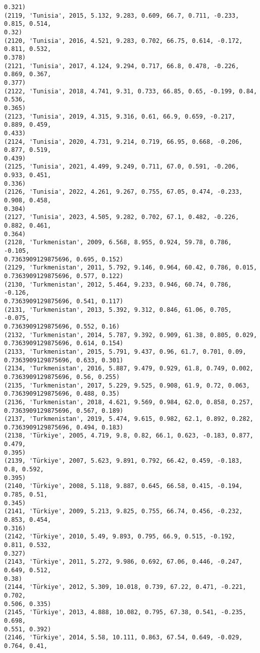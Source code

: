 \documentclass[11pt]{article}
\begin{document}
\begin{Verbatim}[commandchars=\\\{\}]
0.321)
(2119, 'Tunisia', 2015, 5.132, 9.283, 0.609, 66.7, 0.711, -0.233, 0.815, 0.514,
0.32)
(2120, 'Tunisia', 2016, 4.521, 9.283, 0.702, 66.75, 0.614, -0.172, 0.811, 0.532,
0.378)
(2121, 'Tunisia', 2017, 4.124, 9.294, 0.717, 66.8, 0.478, -0.226, 0.869, 0.367,
0.377)
(2122, 'Tunisia', 2018, 4.741, 9.31, 0.733, 66.85, 0.65, -0.199, 0.84, 0.536,
0.365)
(2123, 'Tunisia', 2019, 4.315, 9.316, 0.61, 66.9, 0.659, -0.217, 0.889, 0.459,
0.433)
(2124, 'Tunisia', 2020, 4.731, 9.214, 0.719, 66.95, 0.668, -0.206, 0.877, 0.519,
0.439)
(2125, 'Tunisia', 2021, 4.499, 9.249, 0.711, 67.0, 0.591, -0.206, 0.933, 0.451,
0.336)
(2126, 'Tunisia', 2022, 4.261, 9.267, 0.755, 67.05, 0.474, -0.233, 0.908, 0.458,
0.304)
(2127, 'Tunisia', 2023, 4.505, 9.282, 0.702, 67.1, 0.482, -0.226, 0.882, 0.461,
0.364)
(2128, 'Turkmenistan', 2009, 6.568, 8.955, 0.924, 59.78, 0.786, -0.105,
0.7363909129875696, 0.695, 0.152)
(2129, 'Turkmenistan', 2011, 5.792, 9.146, 0.964, 60.42, 0.786, 0.015,
0.7363909129875696, 0.577, 0.122)
(2130, 'Turkmenistan', 2012, 5.464, 9.233, 0.946, 60.74, 0.786, -0.126,
0.7363909129875696, 0.541, 0.117)
(2131, 'Turkmenistan', 2013, 5.392, 9.312, 0.846, 61.06, 0.705, -0.075,
0.7363909129875696, 0.552, 0.16)
(2132, 'Turkmenistan', 2014, 5.787, 9.392, 0.909, 61.38, 0.805, 0.029,
0.7363909129875696, 0.614, 0.154)
(2133, 'Turkmenistan', 2015, 5.791, 9.437, 0.96, 61.7, 0.701, 0.09,
0.7363909129875696, 0.633, 0.301)
(2134, 'Turkmenistan', 2016, 5.887, 9.479, 0.929, 61.8, 0.749, 0.002,
0.7363909129875696, 0.56, 0.255)
(2135, 'Turkmenistan', 2017, 5.229, 9.525, 0.908, 61.9, 0.72, 0.063,
0.7363909129875696, 0.488, 0.35)
(2136, 'Turkmenistan', 2018, 4.621, 9.569, 0.984, 62.0, 0.858, 0.257,
0.7363909129875696, 0.567, 0.189)
(2137, 'Turkmenistan', 2019, 5.474, 9.615, 0.982, 62.1, 0.892, 0.282,
0.7363909129875696, 0.494, 0.183)
(2138, 'Türkiye', 2005, 4.719, 9.8, 0.82, 66.1, 0.623, -0.183, 0.877, 0.479,
0.395)
(2139, 'Türkiye', 2007, 5.623, 9.891, 0.792, 66.42, 0.459, -0.183, 0.8, 0.592,
0.395)
(2140, 'Türkiye', 2008, 5.118, 9.887, 0.645, 66.58, 0.415, -0.194, 0.785, 0.51,
0.345)
(2141, 'Türkiye', 2009, 5.213, 9.825, 0.755, 66.74, 0.456, -0.232, 0.853, 0.454,
0.316)
(2142, 'Türkiye', 2010, 5.49, 9.893, 0.795, 66.9, 0.515, -0.192, 0.811, 0.532,
0.327)
(2143, 'Türkiye', 2011, 5.272, 9.986, 0.692, 67.06, 0.446, -0.247, 0.649, 0.512,
0.38)
(2144, 'Türkiye', 2012, 5.309, 10.018, 0.739, 67.22, 0.471, -0.221, 0.702,
0.506, 0.335)
(2145, 'Türkiye', 2013, 4.888, 10.082, 0.795, 67.38, 0.541, -0.235, 0.698,
0.551, 0.392)
(2146, 'Türkiye', 2014, 5.58, 10.111, 0.863, 67.54, 0.649, -0.029, 0.764, 0.41,

\end{Verbatim}
\end{document}
